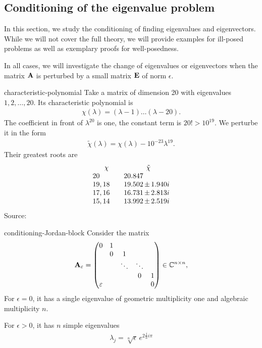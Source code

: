 \subsection{Conditioning of the eigenvalue problem}
In this section, we study the conditioning of finding eigenvalues and
eigenvectors. While we will not cover the full theory, we will provide
examples for ill-posed problems as well as exemplary proofs for
well-posedness.

In all cases, we will investigate the change of eigenvalues or
eigenvectors when the matrix $\mathbf A$ is perturbed by a small matrix
$\mathbf E$ of norm $\epsilon$.

\begin{Example}{characteristic-polynomial}
  Take a matrix of dimension 20 with eigenvalues $1,2,\ldots,20$. Its
  characteristic polynomial is
  \begin{gather}
    \chi(\lambda) = (\lambda-1)\dots(\lambda-20).
  \end{gather}
  The coefficient in front of $\lambda^{20}$ is one, the constant term is $20! > 10^{19}$.
  We perturbe it in the form
  \begin{gather}
    \tilde \chi(\lambda) = \chi(\lambda) - 10^{-23}\lambda^{19}.
  \end{gather}
  Their greatest roots are
  \begin{gather}
    \begin{array}{l@{\qquad}l@{\,}c@{\,}l}
      \multicolumn{1}{c}{\chi}&
      \multicolumn{3}{c}{\tilde \chi}\\
      20&20.847\\
      19,18&19.502&\pm&1.940i\\
      17,16&16.731&\pm&2.813i\\
      15,14&13.992&\pm&2.519i\\
    \end{array}
  \end{gather}
  {\tiny Source: \cite{DeuflhardHohmann08}}
\end{Example}

\begin{Example}{conditioning-Jordan-block}
  Consider the matrix
  \begin{gather}
  \mathbf A_\varepsilon =
      \begin{pmatrix}
        0&1\\
        &0&1\\
        &&\ddots&\ddots\\
        &&&0&1\\
        \varepsilon &&&&0
      \end{pmatrix}
      \in\mathbb C^{n\times n},
  \end{gather}
  For $\epsilon=0$, it has a single eigenvalue of geometric multiplicity one and algebraic multiplicity $n$.
  
  For $\epsilon>0$, it has $n$ simple eigenvalues
  \begin{gather}
      \lambda_j = \sqrt[n]{\epsilon} \,e^{2\frac jni\pi}
  \end{gather}
\end{Example}


